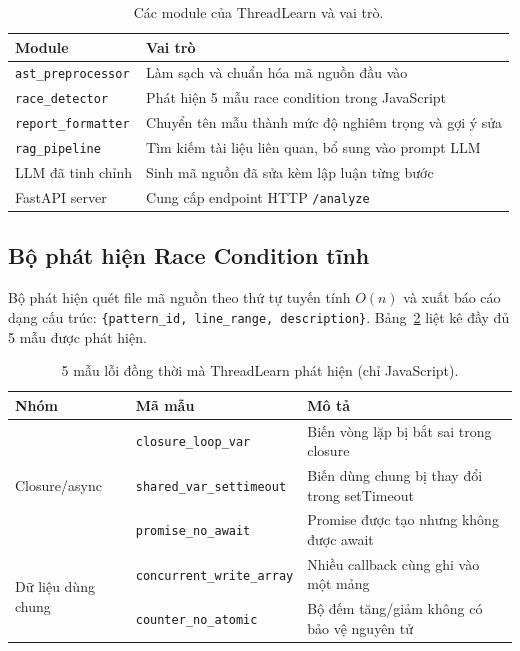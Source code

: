 \documentclass[12pt]{article}
\begin{document}
\begin{table}[ht]
  \centering
  \caption{Các module của ThreadLearn và vai trò.}
  \label{tab:module}
  \begin{tabular}{@{}ll@{}}
    \toprule
    \textbf{Module} & \textbf{Vai trò} \\
    \midrule
    \texttt{ast\_preprocessor} & Làm sạch và chuẩn hóa mã nguồn đầu vào \\
    \texttt{race\_detector}    & Phát hiện 5 mẫu race condition trong JavaScript \\
    \texttt{report\_formatter} & Chuyển tên mẫu thành mức độ nghiêm trọng và gợi ý sửa \\
    \texttt{rag\_pipeline}     & Tìm kiếm tài liệu liên quan, bổ sung vào prompt LLM \\
    LLM đã tinh chỉnh          & Sinh mã nguồn đã sửa kèm lập luận từng bước \\
    FastAPI server             & Cung cấp endpoint HTTP \texttt{/analyze} \\
    \bottomrule
  \end{tabular}
\end{table}

\subsection{Bộ phát hiện Race Condition tĩnh}
\label{sec:detector}

Bộ phát hiện quét file mã nguồn theo thứ tự tuyến tính $O(n)$ và xuất báo cáo
dạng cấu trúc: \texttt{\{pattern\_id, line\_range, description\}}.
Bảng~\ref{tab:mauloi} liệt kê đầy đủ 5 mẫu được phát hiện.

\begin{table}[ht]
  \centering
  \caption{5 mẫu lỗi đồng thời mà ThreadLearn phát hiện (chỉ JavaScript).}
  \label{tab:mauloi}
  \begin{tabular}{@{}llp{6cm}@{}}
    \toprule
    \textbf{Nhóm} & \textbf{Mã mẫu} & \textbf{Mô tả} \\
    \midrule
    \multirow{3}{*}{Closure/async}
      & \texttt{closure\_loop\_var}      & Biến vòng lặp bị bắt sai trong closure \\
      & \texttt{shared\_var\_settimeout} & Biến dùng chung bị thay đổi trong setTimeout \\
      & \texttt{promise\_no\_await}      & Promise được tạo nhưng không được await \\
    \midrule
    \multirow{2}{*}{Dữ liệu dùng chung}
      & \texttt{concurrent\_write\_array} & Nhiều callback cùng ghi vào một mảng \\
      & \texttt{counter\_no\_atomic}      & Bộ đếm tăng/giảm không có bảo vệ nguyên tử \\
    \bottomrule
  \end{tabular}
\end{table}
\end{document}
